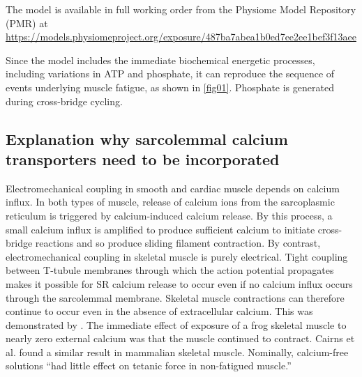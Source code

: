 \documentclass[fleqn,10pt]{physiome}
\begin{document}
The model is available in full working order from the Physiome Model Repository (PMR) at \url{https://models.physiomeproject.org/exposure/487ba7abea1b0ed7ee2ee1bef3f13aee}

Since the model includes the immediate biochemical energetic processes, including variations in ATP and phosphate, it can reproduce the sequence of events underlying muscle fatigue, as shown in \autoref{fig01}. Phosphate is generated during cross-bridge cycling.

\subsection{Explanation why sarcolemmal calcium transporters need to be incorporated}

Electromechanical coupling in smooth and cardiac muscle depends on calcium influx. In both types of muscle, release of calcium ions from the sarcoplasmic reticulum is triggered by calcium-induced calcium release. By this process, a small calcium influx is amplified to produce sufficient calcium to initiate cross-bridge reactions and so produce sliding filament contraction. By contrast, electromechanical coupling in skeletal muscle is purely electrical. Tight coupling between T-tubule membranes through which the action potential propagates makes it possible for SR calcium release to occur even if no calcium influx occurs through the sarcolemmal membrane. Skeletal muscle contractions can therefore continue to occur even in the absence of extracellular calcium. This was demonstrated by \citet{edman1964role}. The immediate effect of exposure of a frog skeletal muscle to nearly zero external calcium was that the muscle continued to contract. Cairns et al. \citep{cairns1998role} found a similar result in mammalian skeletal muscle. Nominally, calcium-free solutions “had little effect on tetanic force in non-fatigued muscle.”
\end{document}
